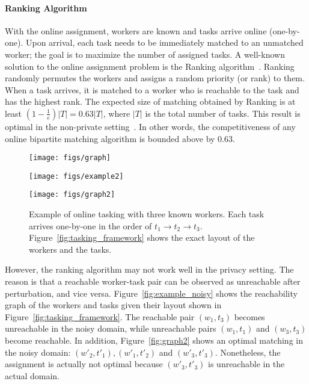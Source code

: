\documentclass{USC-Thesis}
\numberwithin{equation}{chapter}
\begin{document}
\paragraph{Ranking Algorithm}
\label{sec:non-private}
With the online assignment, workers are known and tasks arrive online (one-by-one). Upon arrival, each task needs to be immediately matched to an unmatched worker; the goal is to maximize the number of assigned tasks. A well-known solution to the online assignment problem is the Ranking algorithm~\cite{karp1990optimal}. Ranking randomly permutes the workers and assigns a random priority (or rank) to them. When a task arrives, it is matched to a worker who is reachable to the task and has the highest rank. The expected size of matching obtained by Ranking is at least $(1-\frac{1}{e})|T|=0.63|T|$, where $|T|$ is the total number of tasks. This result is optimal in the non-private setting~\cite{karp1990optimal}. In other words, the competitiveness of any online bipartite matching algorithm is bounded above by 0.63.

\begin{figure}[ht]
	\begin{minipage}[b]{.30\linewidth}
		\centering 
		\texttt{[image: figs/graph]}
		\label{fig:graph}
	\end{minipage}
	\begin{minipage}[b]{.38\linewidth}
		\centering
		\texttt{[image: figs/example2]}
		\label{fig:example_noisy}
	\end{minipage}
	\begin{minipage}[b]{.30\linewidth}
		\centering 
		\texttt{[image: figs/graph2]}
		\label{fig:graph2}
	\end{minipage}
	\caption{Example of online tasking with three known workers. Each task arrives one-by-one in the order of $t_1\rightarrow t_2\rightarrow t_3$. Figure~\ref{fig:tasking_framework} shows the exact layout of the workers and the tasks.}
	\label{fig:exam}
\end{figure}

However, the ranking algorithm may not work well in the privacy setting. The reason is that a reachable worker-task pair can be observed as unreachable after perturbation, and vice versa. Figure~\ref{fig:example_noisy} shows the reachability graph of the workers and tasks given their layout shown in Figure~\ref{fig:tasking_framework}. The reachable pair $(w_1,t_3)$ becomes unreachable in the noisy domain, while unreachable pairs $(w_1,t_1)$ and $(w_3,t_3)$ become reachable. In addition, Figure~\ref{fig:graph2} shows an optimal matching in the noisy domain: $(w'_2,t'_1), (w'_1,t'_2)$ and $(w'_3,t'_3)$. Nonetheless, the assignment is actually not optimal because $(w'_3,t'_3)$ is unreachable in the actual domain.
\end{document}

